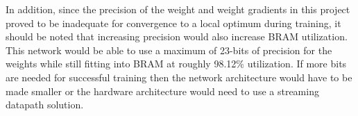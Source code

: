 In addition, since the precision of the weight and weight gradients in this project proved to be inadequate for convergence to a local optimum during training, it should be noted that increasing precision would also increase BRAM utilization. This network would be able to use a maximum of 23-bits of precision for the weights while still fitting into BRAM at roughly 98.12\% utilization. If more bits are needed for successful training then the network architecture would have to be made smaller or the hardware architecture would need to use a streaming datapath solution.
